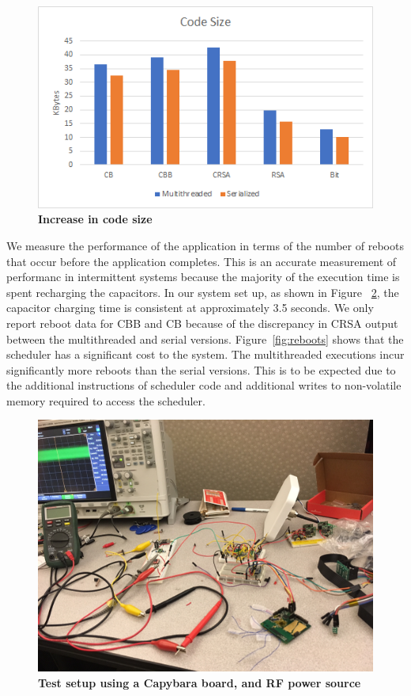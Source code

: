 \documentclass[11pt]{sensys-proc}
\begin{document}
\begin{figure}[h]
  \centering
  \includegraphics[width=0.99\columnwidth]{figs/memory}
  \caption{{\bf Increase in code size}}
  \label{fig:copy}
\end{figure}

We measure the performance of the application in terms of the number of reboots
that occur before the application completes. This is an accurate measurement of
performanc in intermittent systems because the majority of the execution time is
spent recharging the capacitors. In our system set up, as shown in Figure
~\ref{fig:setup}, the capacitor charging time is consistent at approximately 3.5
seconds. We only report reboot data for CBB and CB because of the discrepancy in
CRSA output between the multithreaded and serial versions.
Figure~\ref{fig:reboots} shows that the scheduler has a significant cost to the
system. The multithreaded executions incur significantly more reboots than the
serial versions. This is to be expected due to the additional instructions of
scheduler code and additional writes to non-volatile memory required to access
the scheduler. 
\begin{figure}[h]
  \centering
  \includegraphics[width=0.99\columnwidth]{figs/setup}
  \caption{{\bf Test setup using a Capybara board, and RF power source}}
  \label{fig:setup}
\end{figure}
\end{document}
